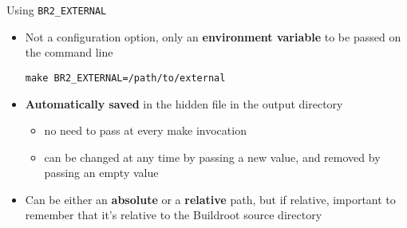 \begin{frame}[fragile]{Using {\tt BR2\_EXTERNAL}}
  \begin{itemize}
  \item Not a configuration option, only an {\bf environment variable}
    to be passed on the command line
    \begin{block}{}
\begin{verbatim}
make BR2_EXTERNAL=/path/to/external
\end{verbatim}
    \end{block}
  \item {\bf Automatically saved} in the hidden 
    file in the output directory
    \begin{itemize}
    \item no need to pass  at every make invocation
    \item can be changed at any time by passing a new value, and
      removed by passing an empty value
    \end{itemize}
  \item Can be either an {\bf absolute} or a {\bf relative} path, but
    if relative, important to remember that it's relative to the
    Buildroot source directory
  \end{itemize}
\end{frame}

